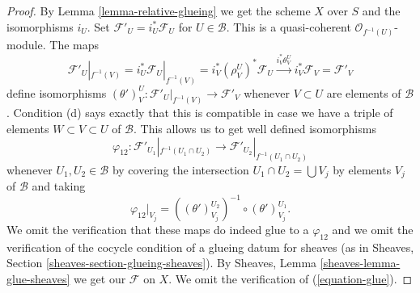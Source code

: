 \begin{proof}
By Lemma \ref{lemma-relative-glueing} we get the scheme $X$ over $S$
and the isomorphisms $i_U$.
Set $\mathcal{F}'_U = i_U^*\mathcal{F}_U$ for $U \in \mathcal{B}$.
This is a quasi-coherent $\mathcal{O}_{f^{-1}(U)}$-module.
The maps
$$
\mathcal{F}'_U|_{f^{-1}(V)} =
i_U^*\mathcal{F}_U|_{f^{-1}(V)} =
i_V^*(\rho^U_V)^*\mathcal{F}_U \xrightarrow{i_V^*\theta^U_V}
i_V^*\mathcal{F}_V = \mathcal{F}'_V
$$
define isomorphisms
$(\theta')^U_V : \mathcal{F}'_U|_{f^{-1}(V)} \to \mathcal{F}'_V$
whenever $V \subset U$ are elements of $\mathcal{B}$.
Condition (d) says exactly that this is compatible in case
we have a triple of elements $W \subset V \subset U$ of $\mathcal{B}$.
This allows us to get well defined isomorphisms
$$
\varphi_{12} :
\mathcal{F}'_{U_1}|_{f^{-1}(U_1 \cap U_2)}
\longrightarrow
\mathcal{F}'_{U_2}|_{f^{-1}(U_1 \cap U_2)}
$$
whenever $U_1, U_2 \in \mathcal{B}$ by covering the intersection
$U_1 \cap U_2 = \bigcup V_j$ by elements $V_j$ of $\mathcal{B}$
and taking
$$
\varphi_{12}|_{V_j} = 
\left((\theta')^{U_2}_{V_j}\right)^{-1}
\circ
(\theta')^{U_1}_{V_j}.
$$
We omit the verification that these maps do indeed glue to a
$\varphi_{12}$ and we omit the verification of the
cocycle condition of a glueing datum for sheaves
(as in Sheaves, Section \ref{sheaves-section-glueing-sheaves}).
By Sheaves, Lemma \ref{sheaves-lemma-glue-sheaves}
we get our $\mathcal{F}$ on $X$. We omit the verification
of (\ref{equation-glue}).
\end{proof}

